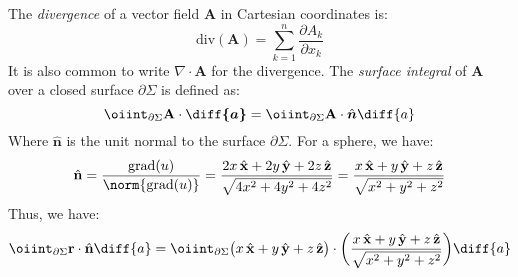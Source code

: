             \begin{solution}
                The \textit{divergence} of a vector field
                $\mathbf{A}$ in Cartesian coordinates is:
                \begin{equation}
                    \mathrm{div}(\mathbf{A})=\sum_{k=1}^{n}
                        \frac{\partial{A}_{k}}{\partial{x}_{k}}
                \end{equation}
                It is also common to write $\nabla\cdot\mathbf{A}$
                for the divergence. The \textit{surface integral}
                of $\mathbf{A}$ over a closed surface
                $\partial\Sigma$ is defined as:
                \begin{equation}
                    \oiint_{\partial\Sigma}
                        \mathbf{A}\cdot\boldsymbol{\diff{a}}
                    =\oiint_{\partial\Sigma}\mathbf{A}
                        \cdot\hat{\boldsymbol{n}}\diff{a}
                \end{equation}
                Where $\hat{\mathbf{n}}$ is the unit normal to the
                surface $\partial\Sigma$. For a sphere, we have:
                \begin{equation}
                    \hat{\mathbf{n}}
                    =\frac{\mathrm{grad}(u)}{\norm{\mathrm{grad}(u)}}
                    =\frac{2x\,\hat{\mathbf{x}}
                          +2y\,\hat{\mathbf{y}}
                          +2z\,\hat{\mathbf{z}}}
                        {\sqrt{4x^{2}+4y^{2}+4z^{2}}}
                    =\frac{x\,\hat{\mathbf{x}}
                          +y\,\hat{\mathbf{y}}
                          +z\,\hat{\mathbf{z}}}
                          {\sqrt{x^{2}+y^{2}+z^{2}}}
                \end{equation}
                Thus, we have:
                \begin{subequations}
                    \begin{align}
                        \oiint_{\partial\Sigma}
                        \mathbf{r}\cdot\hat{\mathbf{n}}\diff{a}
                        &=\oiint_{\partial\Sigma}\big(
                             x\,\hat{\mathbf{x}}
                            +y\,\hat{\mathbf{y}}
                            +z\,\hat{\mathbf{z}}\big)\cdot\bigg(
                            \frac{x\,\hat{\mathbf{x}}
                                 +y\,\hat{\mathbf{y}}
                                 +z\,\hat{\mathbf{z}}}
                                {\sqrt{x^{2}+y^{2}+z^{2}}}
                            \bigg)\diff{a}\\

\end{align}
\end{subequations}
\end{solution}
